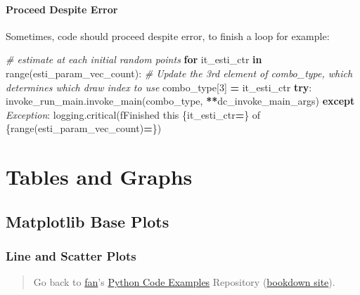\documentclass[
]{book}
\newenvironment{Shaded}{\begin{snugshade}}{\end{snugshade}}
\newcommand{\BuiltInTok}[1]{#1}
\newcommand{\CommentTok}[1]{\textcolor[rgb]{0.56,0.35,0.01}{\textit{#1}}}
\newcommand{\ControlFlowTok}[1]{\textcolor[rgb]{0.13,0.29,0.53}{\textbf{#1}}}
\newcommand{\DecValTok}[1]{\textcolor[rgb]{0.00,0.00,0.81}{#1}}
\newcommand{\KeywordTok}[1]{\textcolor[rgb]{0.13,0.29,0.53}{\textbf{#1}}}
\newcommand{\NormalTok}[1]{#1}
\newcommand{\OperatorTok}[1]{\textcolor[rgb]{0.81,0.36,0.00}{\textbf{#1}}}
\newcommand{\PreprocessorTok}[1]{\textcolor[rgb]{0.56,0.35,0.01}{\textit{#1}}}
\newcommand{\SpecialCharTok}[1]{\textcolor[rgb]{0.00,0.00,0.00}{#1}}
\newcommand{\SpecialStringTok}[1]{\textcolor[rgb]{0.31,0.60,0.02}{#1}}
\begin{document}
\hypertarget{proceed-despite-error}{%
\subsubsection{Proceed Despite Error}\label{proceed-despite-error}}

Sometimes, code should proceed despite error, to finish a loop for example:

\begin{Shaded}
\begin{Highlighting}[]
\CommentTok{\# estimate at each initial random points}
\ControlFlowTok{for}\NormalTok{ it\_esti\_ctr }\KeywordTok{in} \BuiltInTok{range}\NormalTok{(esti\_param\_vec\_count):}
    \CommentTok{\# Update the 3rd element of combo\_type, which determines which draw index to use}
\NormalTok{    combo\_type[}\DecValTok{3}\NormalTok{] }\OperatorTok{=}\NormalTok{ it\_esti\_ctr}
    \ControlFlowTok{try}\NormalTok{:}
\NormalTok{        invoke\_run\_main.invoke\_main(combo\_type, }\OperatorTok{**}\NormalTok{dc\_invoke\_main\_args)}
    \ControlFlowTok{except} \PreprocessorTok{Exception}\NormalTok{:}
\NormalTok{        logging.critical(}\SpecialStringTok{f\textquotesingle{}Finished this }\SpecialCharTok{\{}\NormalTok{it\_esti\_ctr}\OperatorTok{=}\SpecialCharTok{\}}\SpecialStringTok{ of }\SpecialCharTok{\{}\BuiltInTok{range}\NormalTok{(esti\_param\_vec\_count)}\OperatorTok{=}\SpecialCharTok{\}}\SpecialStringTok{\textquotesingle{}}\NormalTok{)}
\end{Highlighting}
\end{Shaded}

\hypertarget{tables-and-graphs}{%
\chapter{Tables and Graphs}\label{tables-and-graphs}}

\hypertarget{matplotlib-base-plots}{%
\section{Matplotlib Base Plots}\label{matplotlib-base-plots}}

\hypertarget{line-and-scatter-plots}{%
\subsection{Line and Scatter Plots}\label{line-and-scatter-plots}}

\begin{quote}
Go back to \href{http://fanwangecon.github.io/}{fan}'s \href{https://fanwangecon.github.io/pyfan/}{Python Code Examples} Repository (\href{https://fanwangecon.github.io/pyfan/bookdown}{bookdown site}).
\end{quote}
\end{document}
